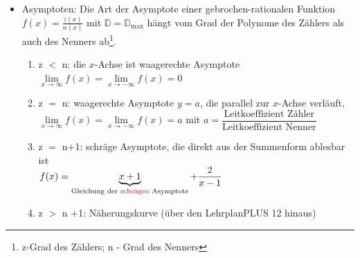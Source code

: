 \begin{itemize}
\\
\mynote Bei der Monotonie- und Krümmungsuntersuchung muss die Definitionslücke explizit betrachtet werden, an der Definitionslücke kann sich das Monotonie- und Krümmungsverhalten ändern
\item Asymptoten: Die Art der Asymptote einer gebrochen-rationalen Funktion $f(x)=\frac{z(x)}{n(x)}$ mit $\mathds{D} = \mathds{D}_{\text{max}}$ hängt vom Grad der Polynome des Zählers  als auch des Nenners ab\footnote{z-Grad des Zählers; n - Grad des Nenners}.\\
\begin{enumerate}\item z $<$ n: die $x$-Achse ist waagerechte Asymptote $\lim\limits_{x\longrightarrow \infty} f(x) = \lim\limits_{x\longrightarrow -\infty} f(x) = 0$\\
\item  z $=$ n: waagerechte Asymptote $y = a$, die parallel zur $x$-Achse verläuft, $\lim\limits_{x\longrightarrow \infty} f(x) = \lim\limits_{x\longrightarrow -\infty} f(x) = a$ mit $a = \dfrac{\text{Leitkoeffizient Zähler}}{\text{Leitkoeffizient Nenner}}$\\
\item z $=$ n+1: schräge Asymptote, die direkt aus der Summenform ablesbar ist \\
\mynote $f(x) =\underbrace{x+1}_{\text{Gleichung der \textcolor{red}{schrägen} Asymptote}} +\dfrac{2}{x-1}$\\
\item z $>$ n +1: Näherungskurve (über den LehrplanPLUS 12 hinaus)
\end{enumerate}
 \end{itemize}
